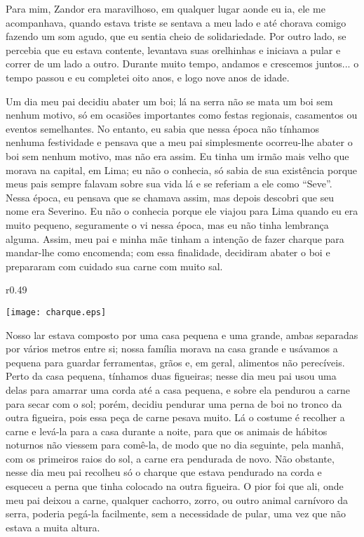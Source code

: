 Para mim, Zandor era maravilhoso, em qualquer lugar aonde eu ia, ele me acompanhava, quando estava triste se sentava a meu lado e até chorava comigo fazendo um som agudo, que eu sentia cheio de solidariedade. 
Por outro lado, se percebia que eu estava contente, levantava suas orelhinhas e iniciava a pular e correr de um lado a outro. 
Durante muito tempo, andamos e crescemos juntos... o tempo passou e eu completei oito anos, e logo nove anos de idade.

Um dia meu pai decidiu abater um boi; lá na serra não se mata um boi sem nenhum motivo, só em ocasiões importantes como festas regionais, casamentos ou eventos semelhantes. 
No entanto, eu sabia que nessa época não tínhamos nenhuma festividade e pensava que a meu pai simplesmente ocorreu-lhe abater o boi sem nenhum motivo, mas não era assim. 
Eu tinha um irmão mais velho que morava na capital, em Lima; eu não o conhecia, só sabia de sua existência porque meus pais sempre falavam sobre sua vida lá e se referiam a ele como ``Seve''. 
Nessa época, eu pensava que se chamava assim, mas depois descobri que seu nome era Severino. 
Eu não o conhecia porque ele viajou para Lima quando eu era muito pequeno, seguramente o vi nessa época, mas eu não tinha lembrança alguma. 
Assim, meu pai e minha mãe tinham a intenção de fazer charque para mandar-lhe como encomenda; 
com essa finalidade, decidiram abater o boi e prepararam com cuidado sua carne com muito sal.

\ifdefined\EnableIncludeImages
\begin{wrapfigure}{r}{0.49\textwidth}
  \begin{center}
  \vspace{-20pt}
    \texttt{[image: charque.eps]}
  \end{center}
  \vspace{-20pt}
\end{wrapfigure}
\fi
Nosso lar estava composto por uma casa pequena e uma grande, ambas separadas por vários metros entre si; nossa família morava na casa grande e usávamos a pequena para guardar ferramentas, grãos e, em geral, alimentos não perecíveis. 
Perto da casa pequena, tínhamos duas figueiras; nesse dia meu pai usou uma delas para amarrar uma corda até a casa pequena, e sobre ela pendurou a carne para secar com o sol; porém, decidiu pendurar uma perna de boi no tronco da outra figueira, pois essa peça de carne pesava muito.
Lá o costume é recolher a carne e levá-la para a casa durante a noite, para que os animais de hábitos noturnos não viessem para comê-la, de modo que no dia seguinte, pela manhã, com os primeiros raios do sol, a carne era pendurada de novo. 
Não obstante, nesse dia meu pai recolheu só o charque que estava pendurado na corda e esqueceu a perna que tinha colocado na outra figueira. 
O pior foi que ali, onde meu pai deixou a carne, qualquer cachorro, zorro, ou outro animal carnívoro da serra, poderia pegá-la facilmente, sem a necessidade de pular, uma vez que não estava a muita altura.

